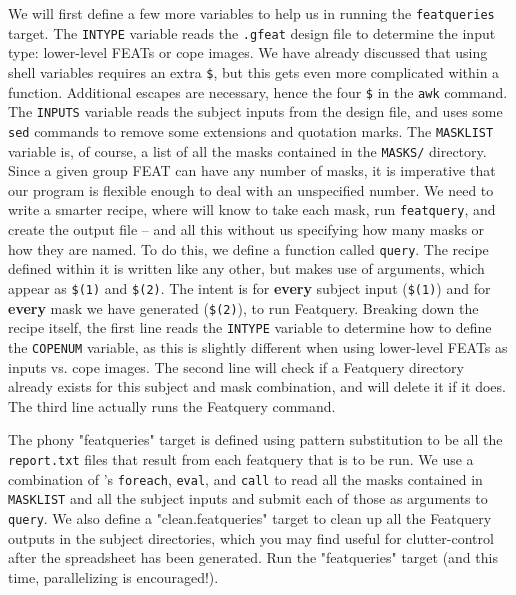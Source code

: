 We will first define a few more variables to help us in running the \texttt{featqueries} target. The \texttt{INTYPE} variable reads the \texttt{.gfeat} design file to determine the input type: lower-level FEATs or cope images. We have already discussed that using shell variables requires an extra \texttt{\$}, but this gets even more complicated within a function. Additional escapes are necessary, hence the four \texttt{\$} in the \texttt{awk} command. The \texttt{INPUTS} variable reads the subject inputs from the design file, and uses some \texttt{sed} commands to remove some extensions and quotation marks. The \texttt{MASKLIST} variable is, of course, a list of all the masks contained in the \texttt{MASKS/} directory. Since a given group FEAT can have any number of masks, it is imperative that our program is flexible enough to deal with an unspecified number. We need to write a smarter recipe, where \maken{} will know to take each mask, run \texttt{featquery}, and create the output file -- and all this without us specifying how many masks or how they are named.  To do this, we define a function called \texttt{query}. The recipe defined within it is written like any other, but makes use of arguments, which appear as \texttt{\$(1)} and \texttt{\$(2)}. The intent is for \textbf{every} subject input (\texttt{\$(1)}) and for \textbf{every} mask we have generated (\texttt{\$(2)}), to run Featquery. Breaking down the recipe itself, the first line reads the \texttt{INTYPE} variable to determine how to define the \texttt{COPENUM} variable, as this is slightly different when using lower-level FEATs as inputs vs. cope images. The second line will check if a Featquery directory already exists for this subject and mask combination, and will delete it if it does. The third line actually runs the Featquery command.

 The phony "featqueries" target is defined using pattern substitution to be all the \texttt{report.txt} files that result from each featquery that is to be run. We use a combination of \maken{}'s \texttt{foreach}, \texttt{eval}, and \texttt{call} to read all the masks contained in \texttt{MASKLIST} and all the subject inputs and submit each of those as arguments to \texttt{query}. We also define a "clean.featqueries" target to clean up all the Featquery outputs in the subject directories, which you may find useful for clutter-control after the spreadsheet has been generated. Run the "featqueries" target (and this time, parallelizing is encouraged!). 

